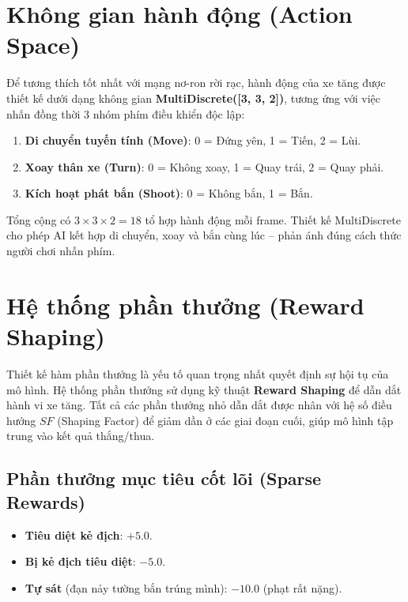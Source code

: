 \documentclass[a4paper, 12pt]{report}
\begin{document}
  \section{Không gian hành động (Action Space)}

  Để tương thích tốt nhất với mạng nơ-ron rời rạc, hành động của xe tăng được thiết kế dưới dạng không gian \textbf{MultiDiscrete([3, 3, 2])}, tương ứng với việc nhấn đồng thời 3 nhóm phím điều khiển độc lập:

  \begin{enumerate}
    \item \textbf{Di chuyển tuyến tính (Move)}: 0 = Đứng yên, 1 = Tiến, 2 = Lùi.
    \item \textbf{Xoay thân xe (Turn)}: 0 = Không xoay, 1 = Quay trái, 2 = Quay phải.
    \item \textbf{Kích hoạt phát bắn (Shoot)}: 0 = Không bắn, 1 = Bắn.
  \end{enumerate}

  Tổng cộng có $3 \times 3 \times 2 = 18$ tổ hợp hành động mỗi frame. Thiết kế MultiDiscrete cho phép AI kết hợp di chuyển, xoay và bắn cùng lúc -- phản ánh đúng cách thức người chơi nhấn phím.

  \section{Hệ thống phần thưởng (Reward Shaping)}
  \label{sec:reward}

  Thiết kế hàm phần thưởng là yếu tố quan trọng nhất quyết định sự hội tụ của mô hình. Hệ thống phần thưởng sử dụng kỹ thuật \textbf{Reward Shaping} để dẫn dắt hành vi xe tăng. Tất cả các phần thưởng nhỏ dẫn dắt được nhân với hệ số điều hướng $SF$ (Shaping Factor) để giảm dần ở các giai đoạn cuối, giúp mô hình tập trung vào kết quả thắng/thua.

  \subsection{Phần thưởng mục tiêu cốt lõi (Sparse Rewards)}
  \begin{itemize}
    \item \textbf{Tiêu diệt kẻ địch}: $+5.0$.
    \item \textbf{Bị kẻ địch tiêu diệt}: $-5.0$.
    \item \textbf{Tự sát} (đạn nảy tường bắn trúng mình): $-10.0$ (phạt rất nặng).
  \end{itemize}
\end{document}
